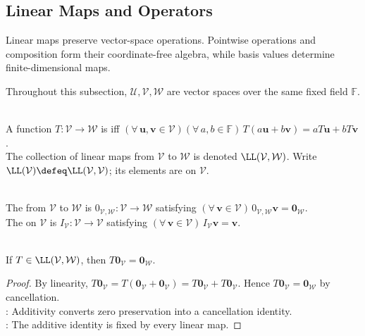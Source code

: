 \subsection{Linear Maps and Operators}
%

Linear maps preserve vector-space operations. Pointwise operations and composition form their coordinate-free algebra, while basis values determine finite-dimensional maps.

Throughout this subsection, $\mathcal{U},\mathcal{V},\mathcal{W}$ are vector spaces over the same fixed field $\mathbb{F}$.

\begin{definition} \label{def:linear-map} \\
A function $T:\mathcal{V}\to\mathcal{W}$ is  iff $(\forall\,\mathbf{u},\mathbf{v}\in\mathcal{V})(\forall\,a,b\in\mathbb{F})\,T(a\mathbf{u}+b\mathbf{v})=aT\mathbf{u}+bT\mathbf{v}$.\\
The collection of linear maps from $\mathcal{V}$ to $\mathcal{W}$ is denoted $\LL(\mathcal{V},\mathcal{W})$. Write $\LL(\mathcal{V})\defeq\LL(\mathcal{V},\mathcal{V})$; its elements are  on $\mathcal{V}$.
\end{definition}

\begin{definition} \\
The  from $\mathcal{V}$ to $\mathcal{W}$ is $0_{\mathcal{V},\mathcal{W}}:\mathcal{V}\to\mathcal{W}$ satisfying $(\forall\,\mathbf{v}\in\mathcal{V})\,0_{\mathcal{V},\mathcal{W}}\mathbf{v}=\mathbf{0}_{\mathcal{W}}$.\\
The  on $\mathcal{V}$ is $I_{\mathcal{V}}:\mathcal{V}\to\mathcal{V}$ satisfying $(\forall\,\mathbf{v}\in\mathcal{V})\,I_{\mathcal{V}}\mathbf{v}=\mathbf{v}$.
\end{definition}

\begin{proposition} \label{prop:linear-maps-send-zero-to-zero} \\
If $T\in\LL(\mathcal{V},\mathcal{W})$, then $T\mathbf{0}_{\mathcal{V}}=\mathbf{0}_{\mathcal{W}}$.
\begin{proof}
By linearity, $T\mathbf{0}_{\mathcal{V}}=T(\mathbf{0}_{\mathcal{V}}+\mathbf{0}_{\mathcal{V}})=T\mathbf{0}_{\mathcal{V}}+T\mathbf{0}_{\mathcal{V}}$. Hence $T\mathbf{0}_{\mathcal{V}}=\mathbf{0}_{\mathcal{W}}$ by cancellation.\\
: Additivity converts zero preservation into a cancellation identity.\\
: The additive identity is fixed by every linear map.
\end{proof}
\end{proposition}

